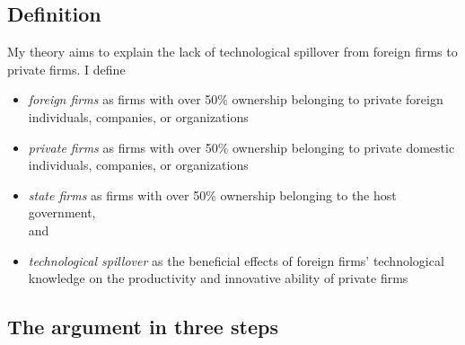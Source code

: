 \subsection*{Definition}

My theory aims to explain the lack of technological spillover from foreign firms to private firms. I define

\begin{itemize}[nosep]
\item \textit{foreign firms} as firms with over 50\% ownership belonging to private foreign individuals, companies, or organizations
\item \textit{private firms} as firms with over 50\% ownership belonging to private domestic individuals, companies, or organizations
\item \textit{state firms} as firms with over 50\% ownership belonging to the host government, \\

and

\item \textit{technological spillover} as the beneficial effects of foreign firms' technological knowledge on the productivity and innovative ability of private firms
\end{itemize}

\subsection*{The argument in three steps}

